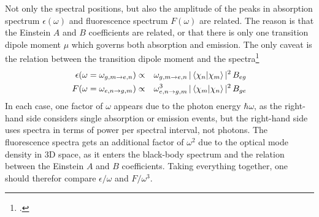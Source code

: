Not only the spectral positions, but also the amplitude of the peaks in absorption spectrum $\epsilon(\omega)$ and fluorescence spectrum $F(\omega)$ are related. The reason is that the Einstein $A$ and $B$ coefficients are related, or that there is only one transition dipole moment $\mu$ which governs both absorption and emission. The only caveat is the relation between the transition dipole moment and the spectra\footcite[Chapter 5.2]{Parson}
\begin{eqnarray*}
   \epsilon(\omega  =  \omega_{g,m \rightarrow e,n} )  & \propto & \omega_{g,m \rightarrow e,n}  \,  | \braket{\chi_n |  \chi_m} |^2 
\, B_{eg} \\
   F(\omega =  \omega_{e,n \rightarrow g,m} ) & \propto & \omega_{e,n \rightarrow g,m}^3 \,  | \braket{\chi_m |  \chi_n} |^2 
\, B_{ge}
\end{eqnarray*}
In each case, one factor of $\omega$ appears due to the photon energy $\hbar \omega$, as the right-hand side considers single absorption or emission events,  but the right-hand side uses spectra in terms of power per spectral interval, not photons. The fluorescence spectra gets an additional factor of $\omega^2$ due to the optical mode density in 3D space, as it enters the black-body spectrum and the relation between the Einstein $A$ and $B$ coefficients.
Taking everything together, one should therefor compare $\epsilon / \omega$ and $F / \omega^3$.




